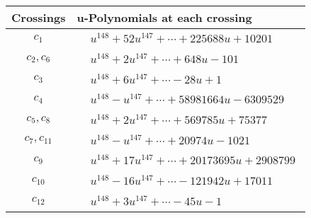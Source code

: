 \documentclass[1p]{elsarticle_modified}
\theoremstyle{definition}
\begin{document}
\begin{tabular}{m{50pt}|m{274pt}}
Crossings & \hspace{64pt}u-Polynomials at each crossing \\
\hline $$\begin{aligned}c_{1}\end{aligned}$$&$\begin{aligned}
&u^{148}+52 u^{147}+\cdots+225688 u+10201
\end{aligned}$\\
\hline $$\begin{aligned}c_{2},c_{6}\end{aligned}$$&$\begin{aligned}
&u^{148}+2 u^{147}+\cdots+648 u-101
\end{aligned}$\\
\hline $$\begin{aligned}c_{3}\end{aligned}$$&$\begin{aligned}
&u^{148}+6 u^{147}+\cdots-28 u+1
\end{aligned}$\\
\hline $$\begin{aligned}c_{4}\end{aligned}$$&$\begin{aligned}
&u^{148}- u^{147}+\cdots+58981664 u-6309529
\end{aligned}$\\
\hline $$\begin{aligned}c_{5},c_{8}\end{aligned}$$&$\begin{aligned}
&u^{148}+2 u^{147}+\cdots+569785 u+75377
\end{aligned}$\\
\hline $$\begin{aligned}c_{7},c_{11}\end{aligned}$$&$\begin{aligned}
&u^{148}- u^{147}+\cdots+20974 u-1021
\end{aligned}$\\
\hline $$\begin{aligned}c_{9}\end{aligned}$$&$\begin{aligned}
&u^{148}+17 u^{147}+\cdots+20173695 u+2908799
\end{aligned}$\\
\hline $$\begin{aligned}c_{10}\end{aligned}$$&$\begin{aligned}
&u^{148}-16 u^{147}+\cdots-121942 u+17011
\end{aligned}$\\
\hline $$\begin{aligned}c_{12}\end{aligned}$$&$\begin{aligned}
&u^{148}+3 u^{147}+\cdots-45 u-1
\end{aligned}$\\
\hline
\end{tabular}\\~\\
\end{document}
